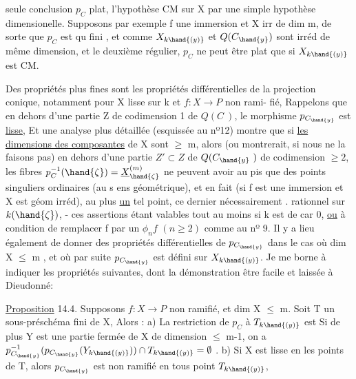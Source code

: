 seule conclusion $p_C$ plat, l'hypothèse CM sur X par une simple hypothèse
dimensionelle. Supposons par exemple f une immersion et X irr de dim m,
de sorte que $p_C$ est qu fini , et comme $X_{k\hand{(y)}}$ et $Q(C_{\hand{y}})$ sont irréd de
même dimension,  et le deuxième régulier, $p_C$ ne peut être
plat que si $X_{k\hand{(y)}}$ est CM.

Des propriétés plus fines sont les propriétés différentielles de
la projection conique, notamment pour X lisse sur k et $f:X\longrightarrow P$ non rami-%
fié,  Rappelons que 
en dehors d'une partie Z de codimension 1 de $Q(C\ )$, le morphisme
$p_{C_{\hand{y}}}$  est \uline{lisse}, Et une analyse plus détaillée (esquissée au nº12) montre
que si \uline{les dimensions des composantes} de X sont $\geq$ m, alors\hand{)}
(ou montrerait, si nous ne la faisons pas)  en dehors d'une partie $Z'\subset Z$
de $Q(C_{\hand{y}}\ )$ de codimension $\geq 2$, les fibres $p_C^{-1}(\hand{\zeta}) = \underline{X}^{(m)}_{\hand{\zeta}}$ ne peuvent
avoir au pis que des points  singuliers ordinaires (au s ens
géométrique), et en fait (si f est une immersion et X est géom irréd),
 au plus \uline{un} tel point, ce dernier   nécessairement  .
rationnel sur $k(\hand{\zeta})$, - ces assertions étant valables tout au moins si
k est de car 0, \uline{ou} à condition de remplacer f par un $\phi_n f$ $(n\geq 2)$ comme
au nº 9. Il y a lieu également de donner des propriétés différentielles
de $p_{C_{\hand{y}}}$ dans le cas où dim X $\leqslant$ m , et où par suite $p_{C_{\hand{y}}}$ est défini sur $X_{k\hand{(y)}}$.
Je me borne à indiquer les propriétés suivantes, dont la démonstration
 être facile et  laissée à Dieudonné:

\uline{Proposition} 14.4. Supposons $f:X\longrightarrow P$ non ramifié, et dim X $\leqslant$ m.
Soit T un sous-préschéma fini de X, Alors :
 a)  La restriction de $p_C$ à $T_{k\hand{(y)}}$ est   Si de
plus Y est une partie fermée de X de dimension $\leqslant$ m-1, on a
$p_{C_{\hand{y}}}^{-1}(p_{C_{\hand{y}}}(Y_{k\hand{(y)}})) \cap T_{k\hand{(y)}} = \emptyset$ .
b) Si X est lisse en les points de T, alors $p_{C_{\hand{y}}}$ est non ramifié
en tous point  $T_{k\hand{(y)}}$,  
